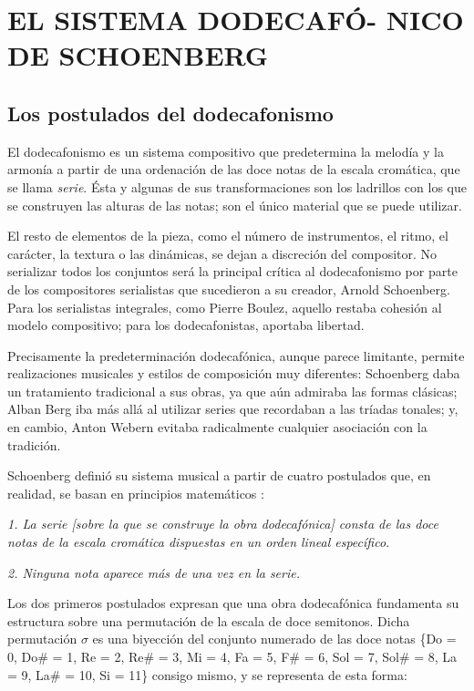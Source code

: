 \chapter[EL SISTEMA DODECAFÓNICO DE SCHOENBERG]{EL SISTEMA DODECAFÓ- NICO DE SCHOENBERG}
	\section{Los postulados del dodecafonismo}
		El dodecafonismo es un sistema compositivo que predetermina la melodía y la armonía a partir de una ordenación de las doce notas de la escala cromática, que se llama \textit{serie}. Ésta y algunas de sus transformaciones son los ladrillos con los que se construyen las alturas de las notas; son el único material que se puede utilizar. \cite{delgado}
		
		El resto de elementos de la pieza, como el número de instrumentos, el ritmo, el carácter, la textura o las dinámicas, se dejan a discreción del compositor. No serializar todos los conjuntos será la principal crítica al dodecafonismo por parte de los compositores serialistas que sucedieron a su creador, Arnold Schoenberg. Para los serialistas integrales, como Pierre Boulez, aquello restaba cohesión al modelo compositivo; para los dodecafonistas, aportaba libertad. \cite{boulez}
		
		Precisamente la predeterminación dodecafónica, aunque parece limitante, permite realizaciones musicales y estilos de composición muy diferentes: Schoenberg daba un tratamiento tradicional a sus obras, ya que aún admiraba las formas clásicas; Alban Berg iba más allá al utilizar series que recordaban a las tríadas tonales; y, en cambio, Anton Webern evitaba radicalmente cualquier asociación con la tradición. \cite{delgado}
		
		Schoenberg definió su sistema musical a partir de cuatro postulados que, en realidad, se basan en principios matemáticos \cite{dominguez}:
		
		\emph{1. La serie \emph{[sobre la que se construye la obra dodecafónica]} consta de las doce notas de la escala cromática dispuestas en un orden lineal específico.}
		
		\emph{2. Ninguna nota aparece más de una vez en la serie.}
		
		Los dos primeros postulados expresan que una obra dodecafónica fundamenta su estructura sobre una permutación de la escala de doce semitonos. Dicha permutación $\sigma$ es una biyección del conjunto numerado de las doce notas \{Do = 0, Do\# = 1, Re = 2, Re\# = 3, Mi = 4, Fa = 5, F\# = 6, Sol = 7, Sol\# = 8, La = 9, La\# = 10, Si = 11\} consigo mismo, y se representa de esta forma:
		
